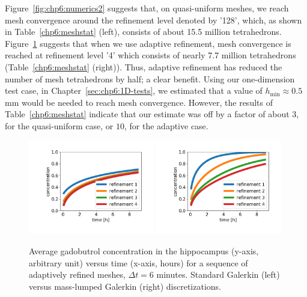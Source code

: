 Figure~\ref{fig:chp6:numerics2} suggests that, on quasi-uniform
meshes, we reach mesh convergence around the refinement level denoted
by '128', which, as shown in Table~\ref{chp6:meshstat} (left),
consists of about 15.5 million
tetrahedrons. Figure~\ref{fig:chp6:numerics3} suggests that when we
use adaptive refinement, mesh convergence is reached at refinement
level '4' which consists of nearly 7.7 million tetrahedrons
(Table~\ref{chp6:meshstat} (right)). Thus, adaptive refinement has
reduced the number of mesh tetrahedrons by half; a clear
benefit. Using our one-dimension test case, in
Chapter~\ref{sec:chp6:1D-tests}, we estimated that a value of
$h_\text{min} \approx 0.5$ mm would be needed to reach mesh
convergence. However, the results of Table~\ref{chp6:meshstat}
indicate that our estimate was off by a factor of about $3$, for the
quasi-uniform case, or $10$, for the adaptive case.
\begin{figure}	
\includegraphics[width=0.49\textwidth]{./graphics/chp6/tracer_hippocampus_notlumped_addaptive.png}
\includegraphics[width=0.49\textwidth]{./graphics/chp6/tracer_hippocampus_lumped_addaptive.png}
  \caption{Average gadobutrol concentration in the hippocampus
    (y-axis, arbitrary unit) versus time (x-axis, hours) for a
    sequence of adaptively refined meshes, $\Delta t = 6$
    minutes. Standard Galerkin (left) versus mass-lumped Galerkin (right)
    discretizations.}
\label{fig:chp6:numerics3}
\end{figure}

